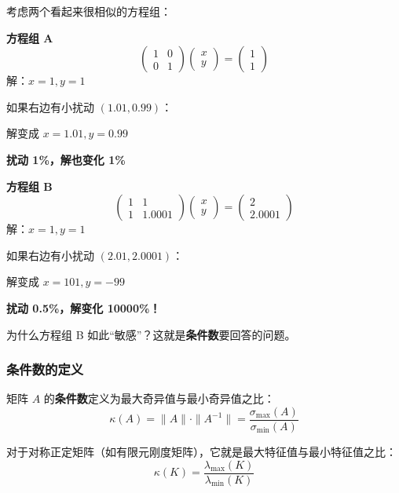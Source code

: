 考虑两个看起来很相似的方程组：

\noindent\begin{minipage}[t]{0.48\textwidth}
\textbf{方程组 A}
\[
\begin{pmatrix} 1 & 0 \\ 0 & 1 \end{pmatrix}
\begin{pmatrix} x \\ y \end{pmatrix}
= \begin{pmatrix} 1 \\ 1 \end{pmatrix}
\]
解：$x = 1, y = 1$

如果右边有小扰动 $(1.01, 0.99)$：

解变成 $x = 1.01, y = 0.99$

\textbf{扰动 1\%，解也变化 1\%}
\end{minipage}
\hfill
\begin{minipage}[t]{0.48\textwidth}
\textbf{方程组 B}
\[
\begin{pmatrix} 1 & 1 \\ 1 & 1.0001 \end{pmatrix}
\begin{pmatrix} x \\ y \end{pmatrix}
= \begin{pmatrix} 2 \\ 2.0001 \end{pmatrix}
\]
解：$x = 1, y = 1$

如果右边有小扰动 $(2.01, 2.0001)$：

解变成 $x = 101, y = -99$

\textbf{扰动 0.5\%，解变化 10000\%！}
\end{minipage}

\vspace{0.5cm}

为什么方程组 B 如此“敏感”？这就是\textbf{条件数}要回答的问题。

\subsubsection*{条件数的定义}

\begin{keyformula}[title=条件数]
矩阵 $A$ 的\textbf{条件数}定义为最大奇异值与最小奇异值之比：
\begin{equation}
\kappa(A) = \|A\| \cdot \|A^{-1}\| = \frac{\sigma_{\max}(A)}{\sigma_{\min}(A)}
\end{equation}

对于对称正定矩阵（如有限元刚度矩阵），它就是最大特征值与最小特征值之比：
\begin{equation}
\kappa(K) = \frac{\lambda_{\max}(K)}{\lambda_{\min}(K)}
\end{equation}
\end{keyformula}

